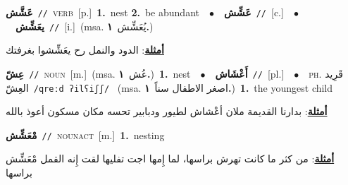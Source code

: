 \documentclass[10pt,a4paper,twoside]{article} %
\begin{document}
\begin{multicols}{2}
{\setlength\topsep{0pt}\textbf{\foreignlanguage{arabic}{عَشَّش}}\ {\color{gray}\texttt{//}\color{black}}\ \textsc{verb}\ [p.]\ \textbf{1.}~nest  \textbf{2.}~be abundant\ \ $\bullet$\ \ \setlength\topsep{0pt}\textbf{\foreignlanguage{arabic}{عَشِّش}}\ {\color{gray}\texttt{//}\color{black}}\ [c.]\ \ $\bullet$\ \ \setlength\topsep{0pt}\textbf{\foreignlanguage{arabic}{يعَشِّش}}\ {\color{gray}\texttt{//}\color{black}}\ [i.]\ \color{gray}(msa. \foreignlanguage{arabic}{يُعَشِّش}~\foreignlanguage{arabic}{\textbf{١.}})\color{black}\  \begin{flushright}\color{gray}\foreignlanguage{arabic}{\textbf{\underline{\foreignlanguage{arabic}{أمثلة}}}: الدود والنمل رح يعَشِّشوا بغرفتك}\end{flushright}\color{black}} \vspace{2mm}

{\setlength\topsep{0pt}\textbf{\foreignlanguage{arabic}{عِشّ}}\ {\color{gray}\texttt{//}\color{black}}\ \textsc{noun}\ [m.]\ \color{gray}(msa. \foreignlanguage{arabic}{عُش}~\foreignlanguage{arabic}{\textbf{١.}})\color{black}\ \textbf{1.}~nest\ \ $\bullet$\ \ \setlength\topsep{0pt}\textbf{\foreignlanguage{arabic}{أَعْشَاش}}\ {\color{gray}\texttt{//}\color{black}}\ [pl.]\ \ $\bullet$\ \ \textsc{ph.} \color{gray} \foreignlanguage{arabic}{قَرِيد العِشّ}\color{black}\ {\color{gray}\texttt{/{\sffamily qreːd ʔilʕiʃʃ}/}\color{black}}\ \color{gray} (msa. \foreignlanguage{arabic}{اصغر الاطفال سناً}~\foreignlanguage{arabic}{\textbf{١.}})\color{black}\ \textbf{1.}~the youngest child\  \begin{flushright}\color{gray}\foreignlanguage{arabic}{\textbf{\underline{\foreignlanguage{arabic}{أمثلة}}}: بدارنا القديمة ملان أعْشاش لطيور ودبابير تحسه مكان مسكون أعوذ بالله}\end{flushright}\color{black}} \vspace{2mm}

{\setlength\topsep{0pt}\textbf{\foreignlanguage{arabic}{مْعَشِّش}}\ {\color{gray}\texttt{//}\color{black}}\ \textsc{noun\textunderscore act}\ [m.]\ \textbf{1.}~nesting\  \begin{flushright}\color{gray}\foreignlanguage{arabic}{\textbf{\underline{\foreignlanguage{arabic}{أمثلة}}}: من كثر ما كانت تهرش براسها، لما إِمها اجت تفليها لقت إِنه القمل مْعَشِّش براسها}\end{flushright}\color{black}} \vspace{2mm}


\end{multicols}
\end{document}
